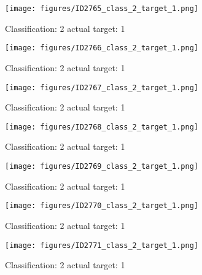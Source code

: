 \begin{figure}[h!]
\begin{center}
\texttt{[image: figures/ID2765\_class\_2\_target\_1.png]}
\end{center}
\caption{ Classification: 2 actual target: 1}
\label{fig:ID2765_class_2_target_1}
\end{figure}
\begin{figure}[h!]
\begin{center}
\texttt{[image: figures/ID2766\_class\_2\_target\_1.png]}
\end{center}
\caption{ Classification: 2 actual target: 1}
\label{fig:ID2766_class_2_target_1}
\end{figure}
\begin{figure}[h!]
\begin{center}
\texttt{[image: figures/ID2767\_class\_2\_target\_1.png]}
\end{center}
\caption{ Classification: 2 actual target: 1}
\label{fig:ID2767_class_2_target_1}
\end{figure}
\begin{figure}[h!]
\begin{center}
\texttt{[image: figures/ID2768\_class\_2\_target\_1.png]}
\end{center}
\caption{ Classification: 2 actual target: 1}
\label{fig:ID2768_class_2_target_1}
\end{figure}
\begin{figure}[h!]
\begin{center}
\texttt{[image: figures/ID2769\_class\_2\_target\_1.png]}
\end{center}
\caption{ Classification: 2 actual target: 1}
\label{fig:ID2769_class_2_target_1}
\end{figure}
\begin{figure}[h!]
\begin{center}
\texttt{[image: figures/ID2770\_class\_2\_target\_1.png]}
\end{center}
\caption{ Classification: 2 actual target: 1}
\label{fig:ID2770_class_2_target_1}
\end{figure}
\begin{figure}[h!]
\begin{center}
\texttt{[image: figures/ID2771\_class\_2\_target\_1.png]}
\end{center}
\caption{ Classification: 2 actual target: 1}
\label{fig:ID2771_class_2_target_1}
\end{figure}
